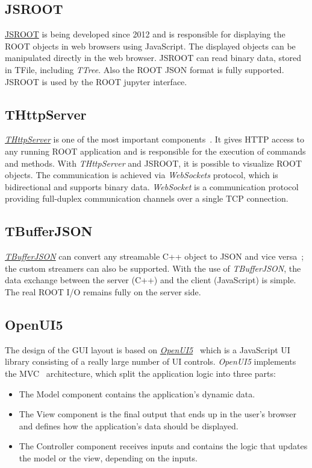 \documentclass[a4paper]{jpconf}
\begin{document}
\subsection{JSROOT}

\href{https://github.com/root-project/jsroot/}{JSROOT} is being developed since
2012 and is responsible for displaying the ROOT objects in web browsers using
JavaScript. The displayed objects can be manipulated directly in
the web browser. JSROOT can read binary data, stored in TFile, including \textit{TTree}.
Also the ROOT JSON format is fully supported. JSROOT is used by the ROOT jupyter\cite{jupyter} interface.

\subsection{THttpServer}

\href{https://github.com/root-project/jsroot/blob/master/docs/HttpServer.md}{{\it THttpServer}} is
one of the most important components~\cite{http}. It gives HTTP access to any running ROOT application
and is responsible for the execution of commands and methods. With {\it THttpServer}
and JSROOT, it is possible to visualize ROOT objects. The communication is achieved
via \textit{WebSockets} protocol, which is bidirectional and supports binary data. \textit{WebSocket}
is a communication protocol providing full-duplex communication channels over a
single TCP connection.

\subsection{TBufferJSON}

\href{https://root.cern/doc/master/classTBufferJSON.html}{\textit{TBufferJSON}} can convert
any streamable C++ object to JSON and vice versa~\cite{buffer}; the custom streamers
can also be supported. With the use of \textit{TBufferJSON}, the data exchange between the server (C++)
and the client (JavaScript) is simple. The real ROOT I/O remains fully on the server side.

\subsection{OpenUI5}
The design of the GUI layout is based on \textit{\href{https://openui5.hana.ondemand.com/}{OpenUI5}}~\cite{openui}
which is a JavaScript UI library consisting of a really large number of UI controls.
\textit{OpenUI5} implements the MVC~\cite{mvc} architecture, which split
the application logic into three parts:
\begin{itemize}
  \item The Model component contains the application's dynamic data.
  \item The View component is the final output that ends up in the user's browser and defines how the application's data should be displayed.
  \item The Controller component receives inputs and contains the logic that updates the model or the view, depending on the inputs.
\end{itemize}
\end{document}
